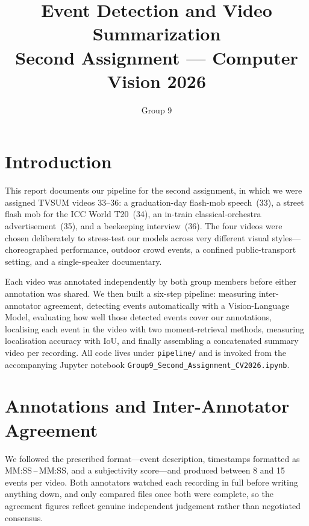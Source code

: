 \documentclass[sigconf, nonacm]{acmart}
\title{Event Detection and Video Summarization\\
       {\normalsize Second Assignment --- Computer Vision 2026}}
\author{Group 9}
\affiliation{%
  \institution{TVSUM Videos 33--36}
}
\begin{document}
\maketitle

\section{Introduction}

This report documents our pipeline for the second assignment, in which we
were assigned TVSUM videos 33--36: a graduation-day flash-mob speech~(33),
a street flash mob for the ICC World T20~(34), an in-train
classical-orchestra advertisement~(35), and a beekeeping interview~(36).
The four videos were chosen deliberately to stress-test our models across
very different visual styles---choreographed performance, outdoor crowd
events, a confined public-transport setting, and a single-speaker
documentary.

Each video was annotated independently by both group members before either
annotation was shared. We then built a six-step pipeline: measuring
inter-annotator agreement, detecting events automatically with a
Vision-Language Model, evaluating how well those detected events cover our
annotations, localising each event in the video with two moment-retrieval
methods, measuring localisation accuracy with IoU, and finally assembling a
concatenated summary video per recording. All code lives under \texttt{pipeline/} and is invoked from the
accompanying Jupyter notebook
\texttt{Group9\_\allowbreak Second\_\allowbreak Assignment\_\allowbreak CV2026.ipynb}.

\section{Annotations and Inter-Annotator Agreement}

We followed the prescribed format---event description, timestamps
formatted as MM:SS\,--\,MM:SS, and a subjectivity score---and produced
between 8 and 15 events per video. Both annotators watched each recording
in full before writing anything down, and only compared files once both
were complete, so the agreement figures reflect genuine independent
judgement rather than negotiated consensus.
\end{document}
